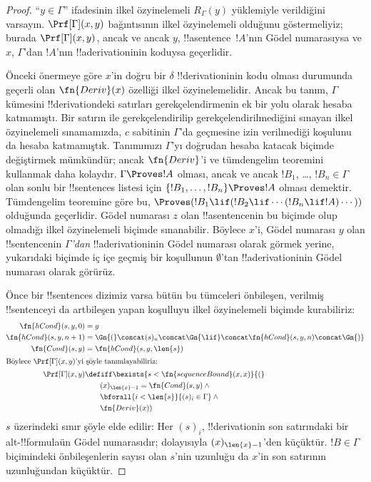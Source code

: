 \begin{proof}
``$y \in \Gamma$'' ifadesinin ilkel özyinelemeli $R_\Gamma(y)$ yüklemiyle
verildiğini varsayın. $\Prf[\Gamma](x,y)$ bağıntısının ilkel özyinelemeli
olduğunu göstermeliyiz; burada $\Prf[\Gamma](x,y)$, ancak ve ancak $y$,
!!a{sentence}~$!A$'nın Gödel numarasıysa ve $x$, $\Gamma$'dan $!A$'nın
!!a{derivation}{}inin koduysa geçerlidir.

Önceki önermeye göre $x$'in doğru bir $\delta$ !!{derivation}{}inin kodu olması
durumunda geçerli olan $\fn{Deriv}(x)$ özelliği ilkel özyinelemelidir. Ancak
bu tanım, $\Gamma$ kümesini !!{derivation}{}deki satırları gerekçelendirmenin
ek bir yolu olarak hesaba katmamıştı. Bir satırın \QR{} ile gerekçelendirilip
gerekçelendirilmediğini sınayan ilkel özyinelemeli sınamamızda, $c$ sabitinin
$\Gamma$'da geçmesine izin verilmediği koşulunu da hesaba katmamıştık.
Tanımımızı $\Gamma$'yı doğrudan hesaba katacak biçimde değiştirmek mümkündür;
ancak $\fn{Deriv}$'i ve tümdengelim teoremini kullanmak daha kolaydır.
$\Gamma \Proves !A$ olması, ancak ve ancak $!B_1$, \dots, $!B_n \in
\Gamma$ olan sonlu bir !!{sentence}s listesi için
$\{!B_1, \dots, !B_n\} \Proves !A$ olması demektir. Tümdengelim teoremine
göre bu, $\Proves (!B_1 \lif (!B_2 \lif
\cdots (!B_n \lif !A)\cdots))$ olduğunda geçerlidir. Gödel numarası $z$ olan
!!a{sentence}{}nin bu biçimde olup olmadığı ilkel özyinelemeli biçimde
sınanabilir. Böylece $x$'i, Gödel numarası $y$ olan !!{sentence}{}nin
\emph{$\Gamma$'dan} !!a{derivation}{}inin Gödel numarası olarak görmek yerine,
yukarıdaki biçimde iç içe geçmiş bir koşullunun $\emptyset$'tan
!!a{derivation}{}inin Gödel numarası olarak görürüz.

Önce bir !!{sentence}s dizimiz varsa bütün bu tümceleri önbileşen, verilmiş
!!{sentence}{}yi da artbileşen yapan koşulluyu ilkel özyinelemeli biçimde
kurabiliriz:
\begin{align*}
  \fn{hCond}(s, y, 0) & = y \\
  \fn{hCond}(s, y, n+1) & = \Gn{(} \concat (s)_{n} \concat \Gn{\lif}
  \concat \fn{hCond}(s, y, n) \concat \Gn{)}\\
  \fn{Cond}(s, y) & = \fn{hCond}(s, y, \len{s})\\
  \intertext{Böylece $\Prf[\Gamma](x, y)$'yi şöyle tanımlayabiliriz:}
  \Prf[\Gamma](x, y) & \defiff \bexists{s < \fn{sequenceBound}(x,x)}{(} \\
  &\qquad (x)_{\len{x}-1} = \fn{Cond}(s,y) \land {} \\
  &\qquad\bforall{i<\len{s}}{(s)_i \in \Gamma} \land {} \\
  &\qquad\fn{Deriv}(x))
\end{align*}
$s$ üzerindeki sınır şöyle elde edilir: Her $(s)_i$, !!{derivation}{}in son
satırındaki bir alt-!!{formula}{}ün Gödel numarasıdır; dolayısıyla
$(x)_{\len{x}-1}$'den küçüktür. $!B \in \Gamma$ biçimindeki önbileşenlerin
sayısı olan $s$'nin uzunluğu da $x$'in son satırının uzunluğundan
küçüktür.
\end{proof}

